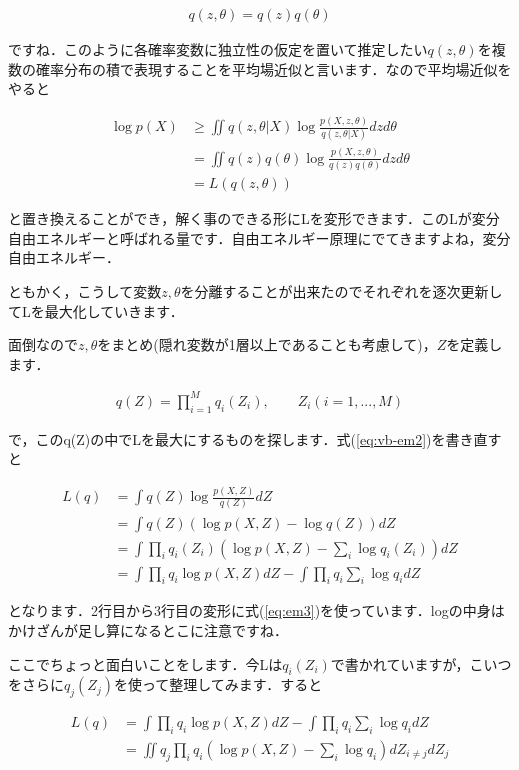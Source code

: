 \documentclass[11pt,a4paper,dvipdfmx]{ujreport}
\begin{document}
\begin{align}
  q(z,\theta) = q(z)q(\theta)
\end{align}

ですね．このように各確率変数に独立性の仮定を置いて推定したい$q(z,θ)$を複数の確率分布の積で表現することを平均場近似と言います．なので平均場近似をやると

\begin{align}
  \log p(X) &
  \geq \iint q(z,\theta|X) \log \frac{p(X,z,\theta)}{q(z,\theta|X)}dzd\theta\nonumber\\
  &= \iint q(z)q(\theta) \log \frac{p(X,z,\theta)}{q(z)q(\theta)}dzd\theta\nonumber\\
  &= L(q(z,\theta))
  \label{eq:vb-em2}
\end{align}

と置き換えることができ，解く事のできる形にLを変形できます．このLが変分自由エネルギーと呼ばれる量です．自由エネルギー原理にでてきますよね，変分自由エネルギー．

ともかく，こうして変数$z,\theta$を分離することが出来たのでそれぞれを逐次更新してLを最大化していきます．

面倒なので$z,\theta$をまとめ(隠れ変数が1層以上であることも考慮して)，$Z$を定義します．

\begin{align}
  q(Z) = \prod_{i=1}^M q_i(Z_i), \qquad Z_i(i=1,...,M)
  \label{eq:vb-em3}
\end{align}

で，このq(Z)の中でLを最大にするものを探します．式(\ref{eq:vb-em2})を書き直すと

\begin{align}
  L(q) &= \int q(Z)\log \frac{p(X,Z)}{q(Z)}dZ\\
  &= \int q(Z)(\log p(X,Z)-\log q(Z))dZ\\
  &= \int \prod_i q_i(Z_i)(\log p(X,Z)- \sum_i \log q_i(Z_i))dZ\\
  &= \int \prod_i q_i \log p(X,Z)dZ - \int \prod_i q_i\sum_i \log q_i dZ
\end{align}

となります．2行目から3行目の変形に式(\ref{eq:em3})を使っています．logの中身はかけざんが足し算になるとこに注意ですね．

ここでちょっと面白いことをします．今Lは$q_i(Z_i)$で書かれていますが，こいつをさらに$q_j(Z_j)$を使って整理してみます．すると

\begin{align}
  L(q) &= \int \prod_i q_i \log p(X,Z)dZ - \int \prod_i q_i\sum_i \log q_i dZ\\
  &=\iint q_j\prod_i q_i (\log p(X,Z) - \sum_i \log q_i) dZ_{i \neq j}dZ_j
\end{align}
\end{document}
